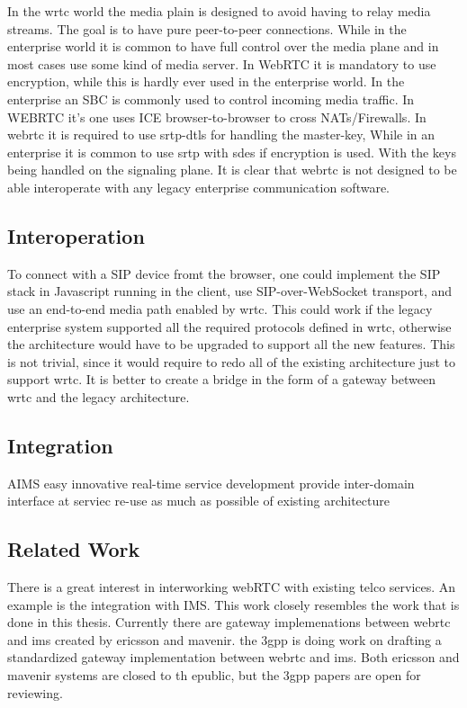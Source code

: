 In the \gls{wrtc} world the media plain is designed to avoid having to relay media streams. The goal is to have pure peer-to-peer connections. While in the enterprise world it is common to have full control over the media plane and in most cases use some kind of media server. In WebRTC it is mandatory to use encryption, while this is hardly ever used in the enterprise world. In the enterprise an SBC is commonly used to control incoming media traffic. In WEBRTC it's one uses ICE browser-to-browser to cross NATs/Firewalls. In webrtc it is required to use srtp-dtls for handling the master-key, While in an enterprise it is common to use srtp with sdes if encryption is used. With the keys being handled on the signaling plane. It is clear that webrtc is not designed to be able interoperate with any legacy enterprise communication software.

\subsection{Interoperation}
To connect with a SIP device fromt the browser, one could implement the SIP stack in Javascript running in the client, use SIP-over-WebSocket transport, and use an end-to-end media path enabled by \gls{wrtc}. This could work if the legacy enterprise system supported all the required protocols defined in \gls{wrtc}, otherwise the architecture would have to be upgraded to support all the new features. This is not trivial, since it would require to redo all of the existing architecture just to support \gls{wrtc}. It is better to create a bridge in the form of a gateway between \gls{wrtc} and the legacy architecture.

\subsection{Integration}
AIMS
easy innovative real-time service development
provide inter-domain interface at serviec
re-use as much as possible of existing architecture


\subsection{Related Work}
There is a great interest in interworking webRTC with existing telco services. An example is the integration with IMS. This work closely resembles the work that is done in this thesis. Currently there are gateway implemenations between webrtc and ims created by ericsson and mavenir. the 3gpp is doing work on drafting a standardized gateway implementation between webrtc and ims. Both ericsson and mavenir systems are closed to th epublic, but the 3gpp papers are open for reviewing.